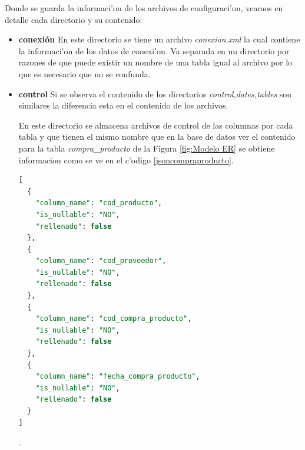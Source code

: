 Donde se guarda la informaci'on de los archivos de configuraci'on, veamos en detalle cada directorio y su contenido:
\begin{itemize}
\item \textbf{conexi\'on} En este directorio se tiene un archivo \textit{conexion.xml} la cual contiene la informaci'on de los datos de conexi'on. Va separada en un directorio por razones de que puede existir un nombre de una tabla igual al archivo por lo que es necesario que no se confunda.
\item \textbf{control} Si se observa el contenido de los directorios \textit{control,dates,tables} son similares la diferencia esta en el contenido de los archivos.
 
En este directorio se almacena archivos de control de las columnas por cada tabla y que tienen el mismo nombre que en la base de datos ver el contenido para la tabla \textit{compra\_producto} de la Figura \ref{fig:Modelo ER} se obtiene informacion como se ve en el c'odigo \ref{jsoncompraproducto}.
\begin{lstlisting}[caption={Ejemplo archivo control},label={jsoncompraproducto},language=sql]
[
  {
    "column_name": "cod_producto",
    "is_nullable": "NO",
    "rellenado": false
  },
  {
    "column_name": "cod_proveedor",
    "is_nullable": "NO",
    "rellenado": false
  },
  {
    "column_name": "cod_compra_producto",
    "is_nullable": "NO",
    "rellenado": false
  },
  {
    "column_name": "fecha_compra_producto",
    "is_nullable": "NO",
    "rellenado": false
  }
]
\end{lstlisting}.
 

\end{itemize}
